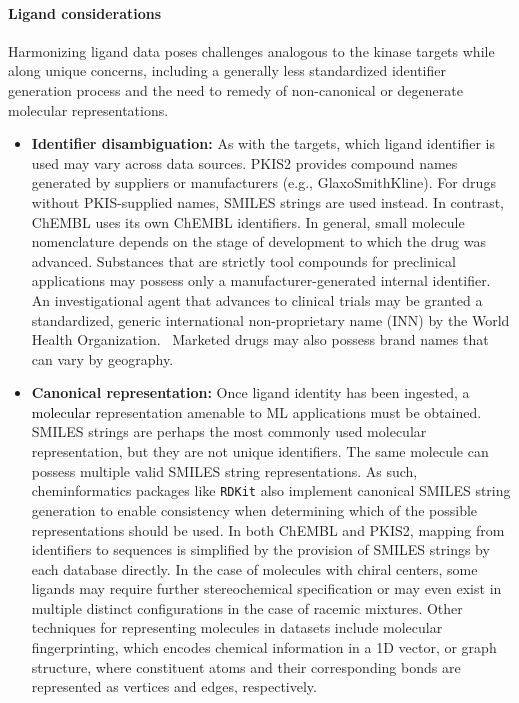 \documentclass[9pt,lessons, pubversion]{livecoms}
\newcommand{\revision}[1]{\textcolor{black}{#1}}
\begin{document}
\paragraph{Ligand considerations}
Harmonizing ligand data poses challenges analogous to the kinase targets while along unique concerns, including a generally less standardized identifier generation process and the need to remedy of non-canonical or degenerate molecular representations. %
\begin{itemize}
\item {\bf Identifier disambiguation:} As with the targets, which ligand identifier is used may vary across data sources. PKIS2 provides compound names generated by suppliers or manufacturers (e.g., GlaxoSmithKline). For drugs without PKIS-supplied names, SMILES strings are used instead. In contrast, ChEMBL uses its own ChEMBL identifiers. In general, small molecule nomenclature depends on the stage of development to which the drug was advanced. Substances that are strictly tool compounds for preclinical applications may possess only a manufacturer-generated internal identifier. An investigational agent that advances to clinical trials may be granted a standardized, generic international non-proprietary name (INN) by the World Health Organization.~\cite{debruyne2018inn} Marketed drugs may also possess brand names that can vary by geography.
\item {\bf Canonical representation:} Once ligand identity has been ingested, a \revision{molecular} representation amenable to ML applications must be obtained. SMILES strings are perhaps the most commonly used molecular representation, but they are not unique identifiers. The same molecule can possess multiple valid SMILES string representations. As such, cheminformatics packages like \texttt{RDKit} also implement canonical SMILES string generation to enable consistency when determining which of the possible representations should be used. In both ChEMBL and PKIS2, mapping from identifiers to sequences is simplified by the provision of SMILES strings by each database directly. In the case of molecules with chiral centers, some ligands may require further stereochemical specification or may even exist in multiple distinct configurations in the case of racemic mixtures. Other techniques for representing molecules in datasets include molecular fingerprinting, which encodes chemical information in a 1D vector, or graph structure, where constituent atoms and their corresponding bonds are represented as vertices and edges, respectively.~\cite{david2020cheminform}

\end{itemize}
\end{document}
